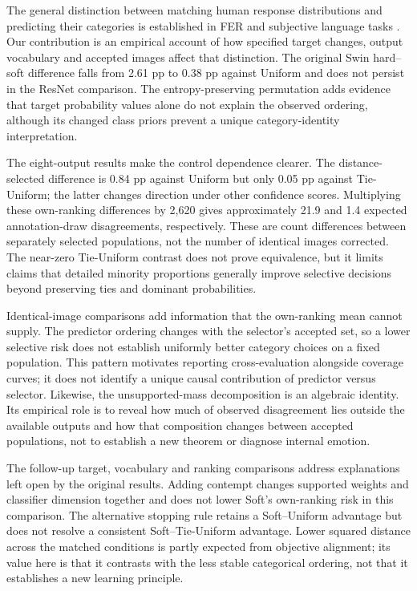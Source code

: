 The general distinction between matching human response distributions and predicting their categories is established in FER and subjective language tasks \cite{barsoum2016ferplus,washington2021crowdsourcing,khurana2024crowd}. Our contribution is an empirical account of how specified target changes, output vocabulary and accepted images affect that distinction. The original Swin hard--soft difference falls from 2.61 pp to 0.38 pp against Uniform and does not persist in the ResNet comparison. The entropy-preserving permutation adds evidence that target probability values alone do not explain the observed ordering, although its changed class priors prevent a unique category-identity interpretation.

The eight-output results make the control dependence clearer. The distance-selected difference is 0.84 pp against Uniform but only 0.05 pp against Tie-Uniform; the latter changes direction under other confidence scores. Multiplying these own-ranking differences by 2,620 gives approximately 21.9 and 1.4 expected annotation-draw disagreements, respectively. These are count differences between separately selected populations, not the number of identical images corrected. The near-zero Tie-Uniform contrast does not prove equivalence, but it limits claims that detailed minority proportions generally improve selective decisions beyond preserving ties and dominant probabilities.

Identical-image comparisons add information that the own-ranking mean cannot supply. The predictor ordering changes with the selector's accepted set, so a lower selective risk does not establish uniformly better category choices on a fixed population. This pattern motivates reporting cross-evaluation alongside coverage curves; it does not identify a unique causal contribution of predictor versus selector. Likewise, the unsupported-mass decomposition is an algebraic identity. Its empirical role is to reveal how much of observed disagreement lies outside the available outputs and how that composition changes between accepted populations, not to establish a new theorem or diagnose internal emotion.

The follow-up target, vocabulary and ranking comparisons address explanations left open by the original results. Adding contempt changes supported weights and classifier dimension together and does not lower Soft's own-ranking risk in this comparison. The alternative stopping rule retains a Soft--Uniform advantage but does not resolve a consistent Soft--Tie-Uniform advantage. Lower squared distance across the matched conditions is partly expected from objective alignment; its value here is that it contrasts with the less stable categorical ordering, not that it establishes a new learning principle.

